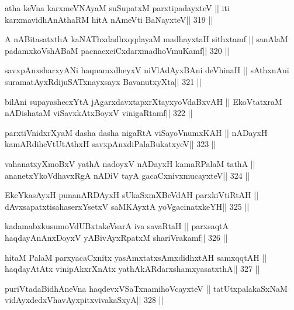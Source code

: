 \begin{shl}
atha keVna karxmeVNAyaM suSupatxM parxtipadayxteV ||
iti karxmavidhAnAthaRM hitA nAmeVti BaNayxteV\hfill || 319 ||
\end{shl}

\begin{shl}
A nABitasatxthA kaNAThxdadhxqqdayaM madhayxtaH sithxtamf ||
sanAlaM padamxkoVshABaM pacnacxciCxdarxmadhoVmuKamf\hfill || 320 ||
\end{shl}

\begin{shl}
savxpAnxsharxyANi haqnamxdheyxV niVlAdAyxBAni deVhinaH ||
sAthxnAni suramatAyxRdijuSATxnayxsayx BavanutxyXta\hfill || 321 ||
\end{shl}

\begin{shl}
bilAni supayashecxYtA jAgarxdavxtapxrXtayxyoVdaBxvAH ||
EkoVtatxraM nADishataM viSavxkAtxBoyxV vinigaRtamf\hfill || 322 ||
\end{shl}

\begin{shl}
parxtiVnidxrXyaM dasha dasha nigaRtA viSayoVnumxKAH ||
nADayxH kamARdiheVtUtAthxH savxpAnxdiPalaBukatxyeV\hfill || 323 ||
\end{shl}

\begin{shl}
vahanatxyXmoBxV yathA nadoyxV nADayxH kamaRPalaM tathA ||
ananetxYkoVdhavxRgA nADiV tayA gacaCxnivxmucayxteV\hfill || 324 ||
\end{shl}

\begin{shl}
EkeYkasAyxH punanARDAyxH sUkaSxmXBeVdAH parxkiVtiRtAH ||
dAvxsapatxtisahaserxYsetxV saMKAyxtA yoVgacinatxkeYH\hfill || 325 ||
\end{shl}

\begin{shl}
kadamabxkusumoVdUBxtakeVsarA iva savaRtaH ||
parxsaqtA haqdayAnAnxDoyxV yABivAyxRpatxM shariVrakamf\hfill || 326 ||
\end{shl}

\begin{shl}
hitaM PalaM parxyacaCxnitx yasAmxtatxsAmxdidhxtAH samxqqtAH ||
haqdayAtAtx vinipAkxrXnAtx yathA\s kARdarxshamxyasatxthA\hfill || 327 ||
\end{shl}

\begin{shl}
puriVtadaBidhAneVna haqdevxVSaTxnamihoVcayxteV ||
tatUtxpalakaSxNaM vidAyxdedxVhavAyxpitxvivakaSxyA\hfill || 328 ||
\end{shl}

